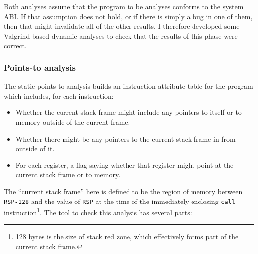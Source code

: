 Both analyses assume that the program to be analyses conforms to the
system ABI.  If that assumption does not hold, or if there is simply a
bug in one of them, then that might invalidate all of the other
results.  I therefore developed some Valgrind-based dynamic analyses
to check that the results of this phase were correct.


\subsubsection{Points-to analysis}
\label{sect:eval:validate:pta}

The static points-to analysis builds an instruction attribute table
for the program which includes, for each instruction:

\begin{itemize}
\item
  Whether the current stack frame might include any pointers to itself
  or to memory outside of the current frame.
\item
  Whether there might be any pointers to the current stack frame in
  from outside of it.
\item
  For each register, a flag saying whether that register might point
  at the current stack frame or to memory.
\end{itemize}

The ``current stack frame'' here is defined to be the region of memory
between \verb|RSP-128| and the value of \verb|RSP| at the time of the
immediately enclosing \verb|call| instruction\footnote{128 bytes is
the size of stack red zone, which effectively forms part of the
current stack frame.}.  The tool to check this analysis
has several parts:

